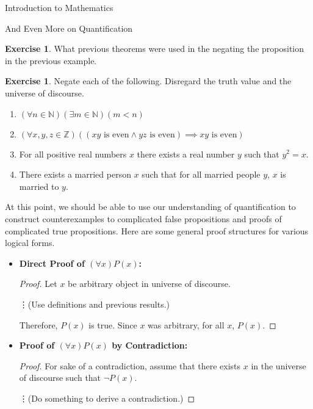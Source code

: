\documentclass[11pt]{article}
\theoremstyle{definition}
\newtheorem{exercise}[theorem]{Exercise}
\begin{document}
\begin{section}{Introduction to Mathematics}
\begin{subsection}{And Even More on Quantification}
\begin{exercise}
What previous theorems were used in the negating the proposition in the previous example.
\end{exercise}

\begin{exercise}
Negate each of the following.  Disregard the truth value and the universe of discourse.
\begin{enumerate}
\item $(\forall n\in\mathbb{N})(\exists m\in\mathbb{N})(m<n)$
\item $(\forall x,y,z\in\mathbb{Z})((xy \mbox{ is even}\wedge yz\mbox{ is even})\implies xy\mbox{ is even})$
\item For all positive real numbers $x$ there exists a real number $y$ such that $y^2=x$.
\item There exists a married person $x$ such that for all married people $y$, $x$ is married to $y$.
\end{enumerate}
\end{exercise}

At this point, we should be able to use our understanding of quantification to construct counterexamples to complicated false propositions and proofs of complicated true propositions.  Here are some general proof structures for various logical forms.

\begin{itemize}
\item[] \textbf{Direct Proof of $(\forall x)P(x)$:}

\begin{proof}
Let $x$ be arbitrary object in universe of discourse.  

\bigskip

\hspace{2in}\vdots \hspace{1cm}(Use definitions and previous results.)

\bigskip

\noindent Therefore, $P(x)$ is true.  Since $x$ was arbitrary, for all $x$, $P(x)$.
\end{proof}

\item[] \textbf{Proof of $(\forall x)P(x)$ by Contradiction:}

\begin{proof}
For sake of a contradiction, assume that there exists $x$ in the universe of discourse such that $\neg P(x)$.
\bigskip

\hspace{2in}\vdots \hspace{1cm}(Do something to derive a contradiction.)


\end{proof}
\end{itemize}
\end{subsection}
\end{section}
\end{document}
